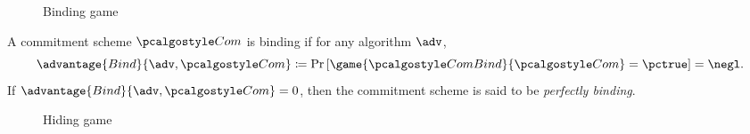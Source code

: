 \begin{figure}[tbhp]
  \begin{center}
    \begin{tcolorbox}[width=8cm]
      \begin{pchstack}[center]
      \end{pchstack}
    \end{tcolorbox}
  \end{center}
  \caption{Binding game \label{fig:break-com-bind}}
\end{figure}

\begin{definition}[Binding]
  A commitment scheme $\algo{Com}$ is binding if for any \ppt algorithm $\adv$,
 \[
  \advantage{Bind}{\adv, \algo{Com}} \defeq \pr{\game{\algo{ComBind}}{\algo{Com}} = \pctrue} = \negl.
 \]
 If $\advantage{Bind}{\adv, \algo{Com}} = 0$, then the commitment scheme is said to be \emph{perfectly binding}.
\end{definition}

\begin{figure}[tbhp]
  \begin{center}
    \begin{tcolorbox}[width=8cm]
      \begin{pchstack}[center]
      \end{pchstack}
    \end{tcolorbox}
  \end{center}
  \caption{Hiding game \label{fig:break-com-hid}}
\end{figure}

